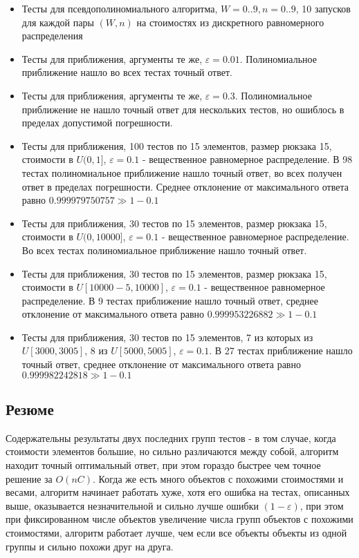 \documentclass{article}
\begin{document}
	\begin{itemize}
		\item Тесты для псевдополиномиального алгоритма, $W = 0..9, n = 0..9$, 10 запусков для каждой пары $(W, n)$ на стоимостях из дискретного равномерного распределения 
		\item Тесты для приближения, аргументы те же, $\varepsilon = 0.01$. Полиномиальное приближение нашло во всех тестах точный ответ.
		\item Тесты для приближения, аргументы те же, $\varepsilon = 0.3$. Полиномиальное приближение не нашло точный ответ для нескольких тестов, но ошиблось в пределах допустимой погрешности.
		\item Тесты для приближения, 100 тестов по 15 элементов, размер рюкзака 15, стоимости в $U(0, 1]$, $\varepsilon = 0.1$ - вещественное равномерное распределение. В 98 тестах полиномиальное приближение нашло точный ответ, во всех получен ответ в пределах погрешности. Среднее отклонение от максимального ответа равно  $0.999979750757 \gg 1 - 0.1$
		\item Тесты для приближения, 30 тестов по 15 элементов, размер рюкзака 15, стоимости в $U(0, 10000]$, $\varepsilon = 0.1$ - вещественное равномерное распределение. Во всех тестах полиномиальное приближение нашло точный ответ.
		\item Тесты для приближения, 30 тестов по 15 элементов, размер рюкзака 15, стоимости в $U[10000-5, 10000]$, $\varepsilon = 0.1$ - вещественное равномерное распределение. В 9 тестах приближение нашло точный ответ, среднее отклонение от максимального ответа равно $0.999953226882 \gg 1 - 0.1$
		\item Тесты для приближения, 30 тестов по 15 элементов, 7 из которых из $U[3000, 3005]$, 8 из $U[5000, 5005]$, $\varepsilon = 0.1$. В 27 тестах приближение нашло точный ответ, среднее отклонение от максимального ответа равно  $0.999982242818 \gg 1 - 0.1$

	\end{itemize}
	
	
	\subsection{Резюме}
	
	Содержательны результаты двух последних групп тестов - в том случае, когда стоимости элементов большие, но сильно различаются между собой, алгоритм находит точный оптимальный ответ, при этом гораздо быстрее чем точное решение за $O(nC)$. Когда же есть много объектов с похожими стоимостями и весами, алгоритм начинает работать хуже, хотя его ошибка на тестах, описанных выше, оказывается незначительной и сильно лучше ошибки $(1 - \varepsilon)$, при этом при фиксированном числе объектов увеличение числа групп объектов с похожими стоимостями, алгоритм работает лучше, чем если все объекты объекты из одной группы и сильно похожи друг на друга.
	
\end{document}
